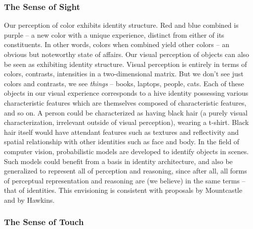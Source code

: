 \documentclass[pra,twocolumn,groupedaddress,10pt]{revtex4}
\theoremstyle{definition}
\begin{document}
\subsubsection{The Sense of Sight} \label{sec:sensig}

Our perception of color exhibits identity structure. Red and blue combined is purple -- a new color with a unique experience, distinct from either of its constituents. In other words, colors when combined yield other colors -- an obvious but noteworthy state of affairs. Our visual perception of objects can also be seen as exhibiting identity structure. Visual perception is entirely in terms of colors, contrasts, intensities in a two-dimensional matrix. But we don't see just colors and contrasts, we see \textit{things} -- books, laptops, people, cats. Each of these objects in our visual experience corresponds to a hive identity possessing various characteristic features which are themselves composed of characteristic features, and so on. A person could be characterized as having black hair (a purely visual characterization, irrelevant outside of visual perception), wearing a t-shirt. Black hair itself would have attendant features such as textures and reflectivity and spatial relationship with other identities such as face and body. In the field of computer vision, probabilistic models are developed to identify objects in scenes. Such models could benefit from a basis in identity architecture, and also be generalized to represent all of perception and reasoning, since after all, all forms of perceptual representation and reasoning are (we believe) in the same terms -- that of identities. This envisioning is consistent with proposals by Mountcastle\cite{mountcastle} and by Hawkins\cite{hawkins}.

\subsubsection{The Sense of Touch} \label{sec:sentou}
\end{document}
